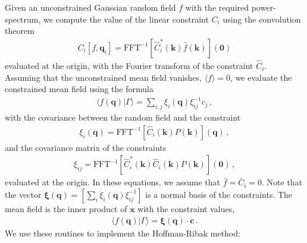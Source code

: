\documentclass[a4paper, 11pt]{article}
\begin{document}
Given an unconstrained Gaussian random field $f$ with the required power-spectrum, we compute the value of the linear constraint $C_i$ using the convolution theorem
\begin{align}
C_i[f,\bm{q}_i]=\text{FFT}^{-1}[\hat{C}_i^*(\bm{k}) \hat{f}(\bm{k})](\bm{0})
\end{align}
evaluated at the origin, with the Fourier transform of the constraint $\hat{C}_i$. Assuming that the unconstrained mean field vanishes, $\langle f \rangle =0$, we evaluate the constrained mean field using the formula
\begin{align}
\langle f(\bm{q}) | \Gamma\rangle = \sum_{i,j} \xi_i(\bm{q})\xi_{ij}^{-1} c_j\,,
\end{align}
with the covariance between the random field and the constraint
\begin{align}
\xi_i(\bm{q}) = \text{FFT}^{-1}[\hat{C}_i(\bm{k}) P(\bm{k})](\bm{q})\,,
\end{align}
and the covariance matrix of the constraints
\begin{align}
\xi_{ij}=\text{FFT}^{-1}[\hat{C}_i^*(\bm{k}) \hat{C}_i(\bm{k}) P(\bm{k})](\bm{0})\,,
\end{align}
evaluated at the origin. In these equations, we assume that $\bar{f}=\bar{C}_i=0$. Note that the vector $\bm{\xi}(\bm{q})=[\sum_i \xi_i(\bm{q}) \xi_{ij}^{-1}]$ is a normal basis of the constraints. The mean field is the inner product of $\bm{x}$ with the constraint values, 
\begin{align}
\langle f(\bm{q}) | \Gamma\rangle = \bm{\xi}(\bm{q})\cdot \bm{c}\,.
\end{align}
We use these routines to implement the Hoffman-Ribak method:\\
\end{document}
